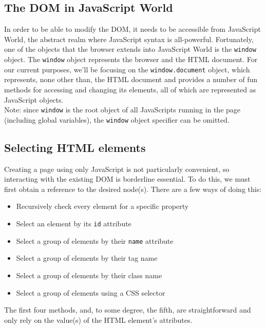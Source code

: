 \documentclass[12pt]{article}
\begin{document}
\subsection{The DOM in JavaScript World}
In order to be able to modify the DOM, it needs to be accessible from JavaScript World, the abstract realm where JavaScript syntax is all-powerful. Fortunately, one of the objects that the browser extends into JavaScript World is the \texttt{window} object. The \texttt{window} object represents the browser and the HTML document. For our current purposes, we'll be focusing on the \texttt{window.document} object, which represents, none other than, the HTML document and provides a number of fun methods for accessing and changing its elements, all of which are represented as JavaScript objects.
\\
Note: since \texttt{window} is the root object of all JavaScripts running in the page (including global variables), the \texttt{window} object specifier can be omitted.

\subsection{Selecting HTML elements}
Creating a page using only JavaScript is not particularly convenient, so interacting with the existing DOM is borderline essential. To do this, we must first obtain a reference to the desired node(s). There are a few ways of doing this:

\begin{itemize}
\item Recursively check every element for a specific property
\item Select an element by its \texttt{id} attribute
\item Select a group of elements by their \texttt{name} attribute
\item Select a group of elements by their tag name
\item Select a group of elements by their class name
\item Select a group of elements using a CSS selector
\end{itemize}
The first four methods, and, to some degree, the fifth, are straightforward and only rely on the value(s) of the HTML element's attributes. 
\end{document}
